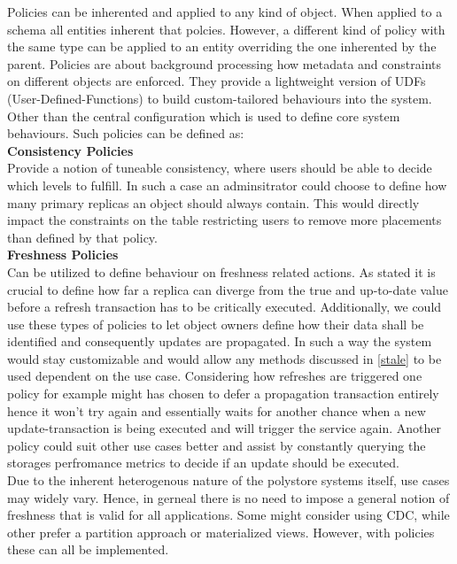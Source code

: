 Policies can be inherented and applied to any kind of object. When applied to a schema all entities inherent that polcies.
However, a different kind of policy with the same type can be applied to an entity overriding the one inherented by the parent.
Policies are about background processing how metadata and constraints on different objects are enforced. 
They provide a lightweight version of UDFs (User-Defined-Functions) to build custom-tailored behaviours into the system.
Other than the central configuration which is used to define core system behaviours. 
Such policies can be defined as:\\


\textbf{Consistency Policies}\\
Provide a notion of tuneable consistency, where users should be able to decide which levels to fulfill.
In such a case an adminsitrator could choose to define how many primary replicas an object should always contain.
This would directly impact the constraints on the table restricting users to remove more placements than defined by that policy.\\


\textbf{Freshness Policies}\\
Can be utilized to define behaviour on freshness related actions. As \cite{fekete:2018} stated it is crucial to define how far a replica can diverge from the true
and up-to-date value before a refresh transaction has to be critically executed.
Additionally, we could use these types of policies to let object owners define how their data shall be identified and consequently updates are propagated.
In such a way the system would stay customizable and would allow any methods discussed in \ref{stale} to be used dependent on the use case.
Considering how refreshes are triggered one policy for example might has chosen to defer a propagation transaction entirely hence it won't try again and
essentially waits for another chance when a new update-transaction is being executed and will trigger the service again. Another policy could suit other use cases better 
and assist by constantly querying the storages perfromance metrics to decide if an update should be executed.\\

Due to the inherent heterogenous nature of the polystore systems itself, use cases may widely vary. Hence, in gerneal there is no need to impose a 
general notion of freshness that is valid for all applications. Some might consider using CDC, while other prefer a partition approach or materialized views.
However, with policies these can all be implemented.\\


